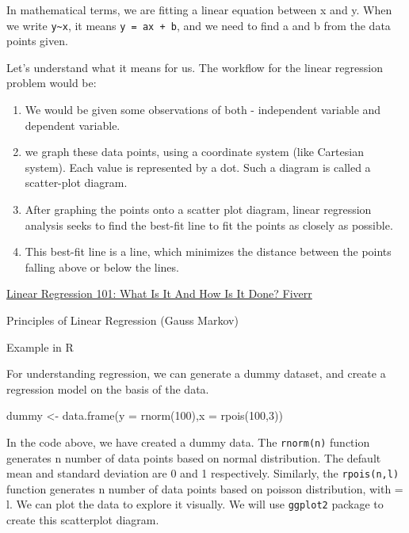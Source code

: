 \documentclass[
  letterpaper,
  paper =a4,
  twoside,
  openright,
  headsepline,
  footsepline,
  listof = totocnumbered,
  chapterprefix = true,
  firstiscover]{scrbook}
\newenvironment{Shaded}{\begin{snugshade}}{\end{snugshade}}
\newcommand{\AttributeTok}[1]{\textcolor[rgb]{0.40,0.45,0.13}{#1}}
\newcommand{\DecValTok}[1]{\textcolor[rgb]{0.68,0.00,0.00}{#1}}
\newcommand{\FunctionTok}[1]{\textcolor[rgb]{0.28,0.35,0.67}{#1}}
\newcommand{\NormalTok}[1]{\textcolor[rgb]{0.00,0.23,0.31}{#1}}
\newcommand{\OtherTok}[1]{\textcolor[rgb]{0.00,0.23,0.31}{#1}}
\begin{document}
In mathematical terms, we are fitting a linear equation between x and y.
When we write \texttt{y\textasciitilde{}x}, it means
\texttt{y\ =\ ax\ +\ b}, and we need to find a and b from the data
points given.

Let's understand what it means for us. The workflow for the linear
regression problem would be:

\begin{enumerate}
\def\labelenumi{\arabic{enumi}.}
\item
  We would be given some observations of both - independent variable and
  dependent variable.
\item
  we graph these data points, using a coordinate system (like Cartesian
  system). Each value is represented by a dot. Such a diagram is called
  a scatter-plot diagram.
\item
  After graphing the points onto a scatter plot diagram, linear
  regression analysis seeks to find the best-fit line to fit the points
  as closely as possible.
\item
  This best-fit line is a line, which minimizes the distance between the
  points falling above or below the lines.
\end{enumerate}

\href{https://www.fiverr.com/resources/guides/data/linear-regression-101}{Linear
Regression 101: What Is It And How Is It Done? \textbar{} Fiverr}

Principles of Linear Regression (Gauss Markov)

Example in R

For understanding regression, we can generate a dummy dataset, and
create a regression model on the basis of the data.

\begin{Shaded}
\begin{Highlighting}[numbers=left,,]
\NormalTok{dummy }\OtherTok{\textless{}{-}} \FunctionTok{data.frame}\NormalTok{(}\AttributeTok{y =} \FunctionTok{rnorm}\NormalTok{(}\DecValTok{100}\NormalTok{),}\AttributeTok{x =} \FunctionTok{rpois}\NormalTok{(}\DecValTok{100}\NormalTok{,}\DecValTok{3}\NormalTok{))}
\end{Highlighting}
\end{Shaded}

In the code above, we have created a dummy data. The \texttt{rnorm(n)}
function generates n number of data points based on normal distribution.
The default mean and standard deviation are 0 and 1 respectively.
Similarly, the \texttt{rpois(n,l)} function generates n number of data
points based on poisson distribution, with \lambda = l. We can plot the
data to explore it visually. We will use \texttt{ggplot2} package to
create this scatterplot diagram.
\end{document}

